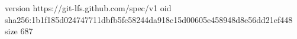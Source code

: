 version https://git-lfs.github.com/spec/v1
oid sha256:1b1f185d024747711dbfb5fc58244da918c15d00605e458948d8e56dd21ef448
size 687
